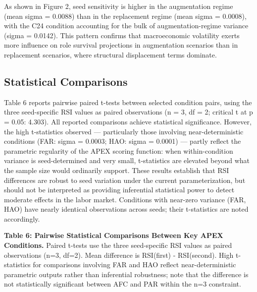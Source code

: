 \documentclass[10pt, conference]{IEEEtran}
\begin{document}
As shown in Figure 2, seed sensitivity is higher in the augmentation regime (mean sigma = 0.0088) than in the replacement regime (mean sigma = 0.0008), with the C24 condition accounting for the bulk of augmentation-regime variance (sigma = 0.0142). This pattern confirms that macroeconomic volatility exerts more influence on role survival projections in augmentation scenarios than in replacement scenarios, where structural displacement terms dominate.



\subsection{Statistical Comparisons}

\label{sec:statistical\_comparisons}

Table 6 reports pairwise paired t-tests between selected condition pairs, using the three seed-specific RSI values as paired observations (n = 3, df = 2; critical t at p = 0.05: 4.303). All reported comparisons achieve statistical significance. However, the high t-statistics observed --- particularly those involving near-deterministic conditions (FAR: sigma = 0.0003; HAO: sigma = 0.0001) --- partly reflect the parametric regularity of the APEX scoring function: when within-condition variance is seed-determined and very small, t-statistics are elevated beyond what the sample size would ordinarily support. These results establish that RSI differences are robust to seed variation under the current parameterization, but should not be interpreted as providing inferential statistical power to detect moderate effects in the labor market. Conditions with near-zero variance (FAR, HAO) have nearly identical observations across seeds; their t-statistics are noted accordingly.

\textbf{Table 6: Pairwise Statistical Comparisons Between Key APEX Conditions.} Paired t-tests use the three seed-specific RSI values as paired observations (n=3, df=2). Mean difference is RSI(first) - RSI(second). High t-statistics for comparisons involving FAR and HAO reflect near-deterministic parametric outputs rather than inferential robustness; note that the difference is not statistically significant between AFC and PAR within the n=3 constraint.
\end{document}
